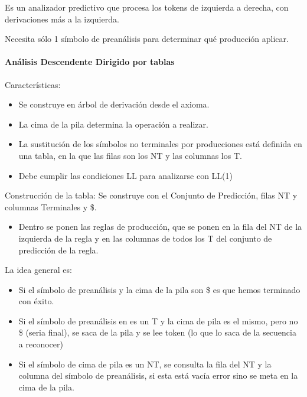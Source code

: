 \documentclass[12pt]{report} %
\begin{document}
Es un analizador predictivo que procesa los tokens de izquierda a
derecha, con derivaciones más a la izquierda.

Necesita sólo 1 símbolo de preanálisis para determinar qué producción
aplicar.


\paragraph{Análisis Descendente Dirigido por tablas}

Características:

\begin{itemize}

\item
  Se construye en árbol de derivación desde el axioma.
\item
  La cima de la pila determina la operación a realizar.
\item
  La sustitución de los símbolos no terminales por producciones está
  definida en una tabla, en la que las filas son los NT y las columnas
  los T.
\item
  Debe cumplir las condiciones LL para analizarse con LL(1)
\end{itemize}

Construcción de la tabla: Se construye con el Conjunto de Predicción,
filas NT y columnas Terminales y \$.

\begin{itemize}

\item
  Dentro se ponen las reglas de producción, que se ponen en la fila del
  NT de la izquierda de la regla y en las columnas de todos los T del
  conjunto de predicción de la regla.
\end{itemize}

La idea general es:

\begin{itemize}

\item
  Si el símbolo de preanálisis y la cima de la pila son \$ es que hemos
  terminado con éxito.
\item
  Si el símbolo de preanálisis en es un T y la cima de pila es el mismo,
  pero no \$ (seria final), se saca de la pila y se lee token (lo que lo
  saca de la secuencia a reconocer)
\item
  Si el símbolo de cima de pila es un NT, se consulta la fila del NT y
  la columna del símbolo de preanálisis, si esta está vacía error sino
  se meta en la cima de la pila.
\end{itemize}
\end{document}
